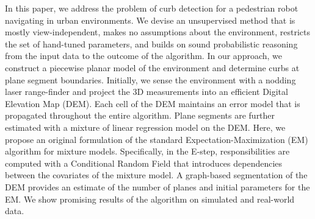 In this paper, we address the problem of curb detection for a pedestrian robot
navigating in urban environments. We devise an unsupervised method that is
mostly view-independent, makes no assumptions about the environment, restricts
the set of hand-tuned parameters, and builds on sound probabilistic reasoning
from the input data to the outcome of the algorithm. In our approach, we
construct a piecewise planar model of the environment and determine curbs at
plane segment boundaries. Initially, we sense the environment with a nodding
laser range-finder and project the 3D measurements into an efficient Digital
Elevation Map (DEM). Each cell of the DEM maintains an error model that is
propagated throughout the entire algorithm. Plane segments are further estimated
with a mixture of linear regression model on the DEM. Here, we propose an
original formulation of the standard Expectation-Maximization (EM) algorithm for
mixture models. Specifically, in the E-step, responsibilities are computed with
a Conditional Random Field that introduces dependencies between the covariates
of the mixture model. A graph-based segmentation of the DEM provides an estimate
of the number of planes and initial parameters for the EM. We show promising
results of the algorithm on simulated and real-world data.

